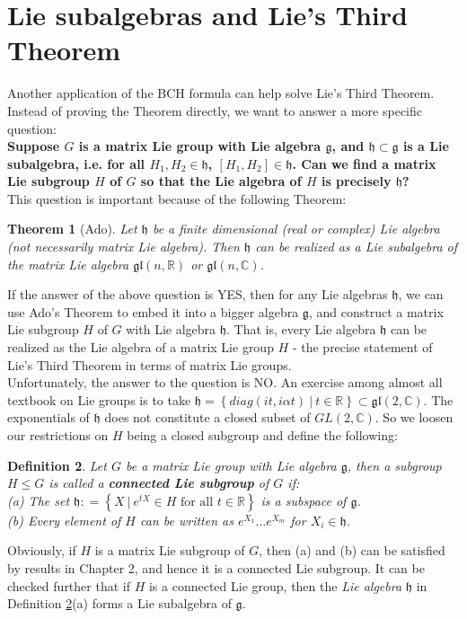 \documentclass[11pt]{book}
\newtheorem{theorem}{Theorem}[section]
\newtheorem{definition}[theorem]{Definition}
\newcommand{\bb}[1]{\mathbb{#1}}
\newcommand{\mf}[1]{\mathfrak{#1}}
\begin{document}
\section{Lie subalgebras and Lie's Third Theorem}
Another application of the BCH formula can help solve Lie's Third Theorem. Instead of proving the Theorem directly, we want to answer a more specific question:\\
\textbf{Suppose $G$ is a matrix Lie group with Lie algebra $\mf{g}$, and $\mf{h} \subset \mf{g}$ is a Lie subalgebra, i.e. for all $H_1, H_2 \in \mf{h}$, $[H_1, H_2] \in \mf{h}$. Can we find a matrix Lie subgroup $H$ of $G$ so that the Lie algebra of $H$ is precisely $\mf{h}$?}\\
This question is important because of the following Theorem:
\begin{theorem}[Ado]
Let $\mf{h}$ be a finite dimensional (real or complex) Lie algebra (not necessarily matrix Lie algebra). Then $\mf{h}$ can be realized as a Lie subalgebra of the matrix Lie algebra $\mf{gl}(n,\bb{R})$ or $\mf{gl}(n,\bb{C})$.
\end{theorem}
If the answer of the above question is YES, then for any Lie algebras $\mf{h}$, we can use Ado's Theorem to embed it into a bigger algebra $\mf{g}$, and construct a matrix Lie subgroup $H$ of $G$ with Lie algebra $\mf{h}$. That is, every Lie algebra $\mf{h}$ can be realized as the Lie algebra of a matrix Lie group $H$ - the precise statement of Lie's Third Theorem in terms of matrix Lie groups.\\

\noindent Unfortunately, the answer to the question is NO. An exercise among almost all textbook on Lie groups is to take $\mf{h} = \left\{ diag(it, i\alpha t)\ \Big|\ t \in \bb{R} \right\} \subset \mf{gl}(2,\bb{C})$. The exponentials of $\mf{h}$ does not constitute a closed subset of $GL(2,\bb{C})$. So we loosen our restrictions on $H$ being a closed subgroup and define the following:
\begin{definition} \label{cls}
Let $G$ be a matrix Lie group with Lie algebra $\mf{g}$, then a subgroup $H \leq G$ is called a \textbf{connected Lie subgroup} of $G$ if:\\
(a) The set $\mf{h} : = \left\{X\ \Big|\ e^{tX} \in H \text{ for all } t \in \bb{R} \right\}$ is a subspace of $\mf{g}$.\\
(b) Every element of $H$ can be written as $e^{X_1} \dots e^{X_m}$ for $X_i \in \mf{h}$.\\
\end{definition}
Obviously, if $H$ is a matrix Lie subgroup of $G$, then (a) and (b) can be satisfied by results in Chapter 2, and hence it is a connected Lie subgroup. It can be checked further that if $H$ is a connected Lie group, then the \textit{Lie algebra} $\mf{h}$ in Definition \ref{cls}(a) forms a Lie subalgebra of $\mf{g}$.\\
\end{document}
